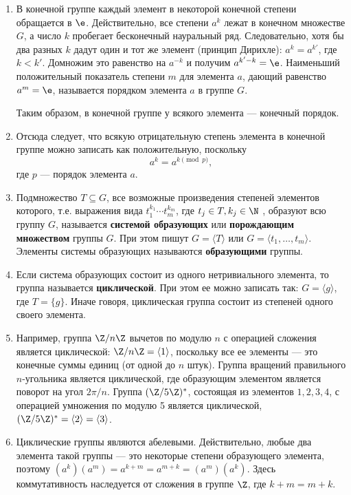 \begin{enumerate}
\item В конечной группе каждый элемент в некоторой конечной степени обращается в $\e$. Действительно, все степени $a^k$ лежат в конечном множестве $G$, а число $k$ пробегает бесконечный науральный ряд. Следовательно, хотя бы два разных $k$ дадут один и тот же элемент (принцип Дирихле): $a^k=a^{k'}$, где $k<k'$. Домножим это равенство на $a^{-k}$ и получим $a^{k'-k}=\e$. Наименьший положительный показатель степени $m$ для элемента $a$, дающий равенство $a^m=\e$, называется порядком элемента $a$ в группе $G$.

Таким образом, в конечной группе у всякого элемента --- конечный порядок.

\item Отсюда следует, что всякую отрицательную степень элемента в конечной группе можно записать как положительную, поскольку
$$
a^k = a^{k\pmod p},
$$
где $p$ --- порядок элемента $a$.

\item Подмножество $T\subseteq G$, все возможные произведения степеней элементов которого, т.е. выражения вида $t_1^{k_1}\cdots t_m^{k_m}$, где $t_j\in T, k_j\in\N$ , образуют всю группу $G$, называется \textbf{системой образующих} или \textbf{порождающим множеством} группы $G$. При этом пишут $G=\langle T\rangle$ или $G=\langle t_1,\dots,t_m\rangle$. Элементы системы образующих называются \textbf{образующими} группы.
\item Если система образующих состоит из одного нетривиального элемента, то группа называется \textbf{циклической}. При этом ее можно записать так: $G=\langle g\rangle$, где $T=\{g\}$. Иначе говоря, циклическая группа состоит из степеней одного своего элемента.
\item Например, группа $\Z/n\Z$ вычетов по модулю $n$ с операцией сложения является циклической: $\Z/n\Z=\langle 1\rangle$, поскольку все ее элементы --- это конечные суммы единиц (от одной до $n$ штук). Группа вращений правильного $n$-угольника является циклической, где образующим элементом является поворот на угол $2\pi/n$. Группа $(\Z/5\Z)^*$, состоящая из элементов $1,2,3,4$, с операцией умножения по модулю 5 является циклической, $(\Z/5\Z)^*=\langle 2\rangle=\langle 3\rangle$.
\item Циклические группы являются абелевыми. Действительно, любые два элемента такой группы --- это некоторые степени образующего элемента, поэтому $(a^k)(a^m)=a^{k+m}=a^{m+k}=(a^m)(a^k)$. Здесь коммутативность наследуется от сложения в группе $\Z$, где $k+m=m+k$.



\end{enumerate}
